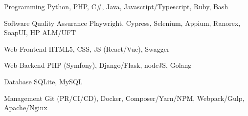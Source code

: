 
\begin{cvskills}

	\cvskill
	{Programming}
    {Python, PHP, C\#, Java, Javascript/Typescript, Ruby, Bash}

	\cvskill
	{Software Quality Assurance}
    {Playwright, Cypress, Selenium, Appium, Ranorex, SoapUI, HP ALM/UFT}

	\cvskill
    {Web-Frontend}
    {HTML5, CSS, JS (React/Vue), Swagger}

    \cvskill
    {Web-Backend}
    {PHP (Symfony), Django/Flask, nodeJS, Golang}

	\cvskill
    {Database}
    {SQLite, MySQL}

	\cvskill
    {Management}
    {Git (PR/CI/CD), Docker, Composer/Yarn/NPM, Webpack/Gulp, Apache/Nginx}

\end{cvskills}
